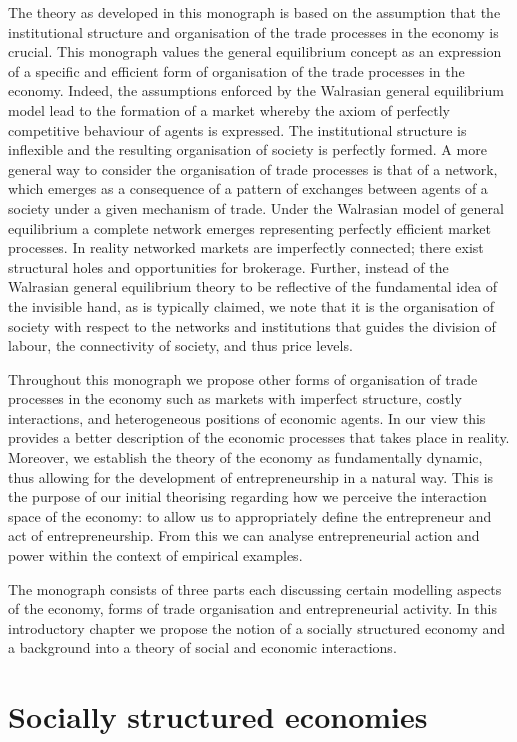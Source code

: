 The theory as developed in this monograph is based on the assumption that the institutional structure and organisation of the trade processes in the economy is crucial. This monograph values the general equilibrium concept as an expression of a specific and efficient form of organisation of the trade processes in the economy. Indeed, the assumptions enforced by the Walrasian general equilibrium model lead to the formation of a market whereby the axiom of perfectly competitive behaviour of agents is expressed. The institutional structure is inflexible and the resulting organisation of society is perfectly formed. A more general way to consider the organisation of trade processes is that of a network, which emerges as a consequence of a pattern of exchanges between agents of a society under a given mechanism of trade. Under the Walrasian model of general equilibrium a complete network emerges representing perfectly efficient market processes. In reality networked markets are imperfectly connected; there exist structural holes and opportunities for brokerage. Further, instead of the Walrasian general equilibrium theory to be reflective of the fundamental idea of the invisible hand, as is typically claimed, we note that it is the organisation of society with respect to the networks and institutions that guides the division of labour, the connectivity of society, and thus price levels.

Throughout this monograph we propose other forms of organisation of trade processes in the economy such as markets with imperfect structure, costly interactions, and heterogeneous positions of economic agents. In our view this provides a better description of the economic processes that takes place in reality. Moreover, we establish the theory of the economy as fundamentally dynamic, thus allowing for the development of entrepreneurship in a natural way. This is the purpose of our initial theorising regarding how we perceive the interaction space of the economy: to allow us to appropriately define the entrepreneur and act of entrepreneurship. From this we can analyse entrepreneurial action and power within the context of empirical examples.

The monograph consists of three parts each discussing certain modelling aspects of the economy, forms of trade organisation and entrepreneurial activity. In this introductory chapter we propose the notion of a socially structured economy and a background into a theory of social and economic interactions.

\section{Socially structured economies}

